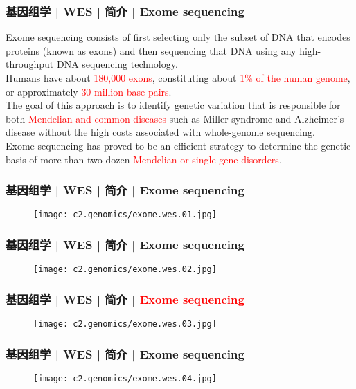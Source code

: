 \begin{frame}
  \frametitle{基因组学 | WES | 简介 | Exome sequencing}
  Exome sequencing consists of first selecting only the subset of DNA that encodes proteins (known as exons) and then sequencing that DNA using any high-throughput DNA sequencing technology.\\
  \vspace{1em}
  Humans have about \textcolor{red}{180,000 exons}, constituting about \textcolor{red}{1\% of the human genome}, or approximately \textcolor{red}{30 million base pairs}.\\
  \vspace{1em}
  The goal of this approach is to identify genetic variation that is responsible for both \textcolor{red}{Mendelian and common diseases} such as Miller syndrome and Alzheimer's disease without the high costs associated with whole-genome sequencing.\\
  \vspace{1em}
  Exome sequencing has proved to be an efficient strategy to determine the genetic basis of more than two dozen \textcolor{red}{Mendelian or single gene disorders}.
\end{frame}

\begin{frame}
  \frametitle{基因组学 | WES | 简介 | Exome sequencing}
  \begin{figure}
    \centering
    \texttt{[image: c2.genomics/exome.wes.01.jpg]}
  \end{figure}
\end{frame}

\begin{frame}
  \frametitle{基因组学 | WES | 简介 | Exome sequencing}
  \begin{figure}
    \centering
    \texttt{[image: c2.genomics/exome.wes.02.jpg]}
  \end{figure}
\end{frame}

\begin{frame}
  \frametitle{基因组学 | WES | 简介 | \textcolor{red}{Exome sequencing}}
  \begin{figure}
    \centering
    \texttt{[image: c2.genomics/exome.wes.03.jpg]}
  \end{figure}
\end{frame}

\begin{frame}
  \frametitle{基因组学 | WES | 简介 | Exome sequencing}
  \begin{figure}
    \centering
    \texttt{[image: c2.genomics/exome.wes.04.jpg]}
  \end{figure}
\end{frame}

